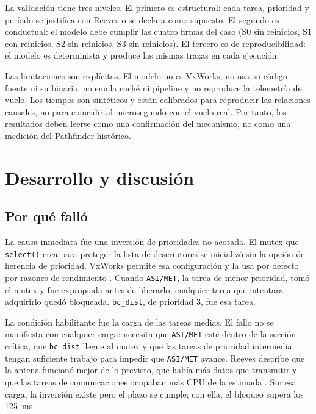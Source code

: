 \documentclass[journal]{IEEEtran}
\begin{document}
La validación tiene tres niveles. El primero es estructural: cada tarea, prioridad y período se justifica con Reeves o se declara como supuesto. El segundo es conductual: el modelo debe cumplir las cuatro firmas del caso (S0 sin reinicios, S1 con reinicios, S2 sin reinicios, S3 sin reinicios). El tercero es de reproducibilidad: el modelo es determinista y produce las mismas trazas en cada ejecución.

Las limitaciones son explícitas. El modelo no es VxWorks, no usa su código fuente ni su binario, no emula caché ni pipeline y no reproduce la telemetría de vuelo. Los tiempos son sintéticos y están calibrados para reproducir las relaciones causales, no para coincidir al microsegundo con el vuelo real. Por tanto, los resultados deben leerse como una confirmación del mecanismo, no como una medición del Pathfinder histórico.

\section{Desarrollo y discusión}
\label{sec:desarrollo}

\subsection{Por qué falló}
\label{sec:porque}

La causa inmediata fue una inversión de prioridades no acotada. El mutex que \texttt{select()} crea para proteger la lista de descriptores se inicializó sin la opción de herencia de prioridad. VxWorks permite esa configuración y la usa por defecto por razones de rendimiento \cite{reeves1997mars,reeves1999priority}. Cuando \texttt{ASI/MET}, la tarea de menor prioridad, tomó el mutex y fue expropiada antes de liberarlo, cualquier tarea que intentara adquirirlo quedó bloqueada. \texttt{bc\_dist}, de prioridad 3, fue esa tarea.

La condición habilitante fue la carga de las tareas medias. El fallo no se manifiesta con cualquier carga: necesita que \texttt{ASI/MET} esté dentro de la sección crítica, que \texttt{bc\_dist} llegue al mutex y que las tareas de prioridad intermedia tengan suficiente trabajo para impedir que \texttt{ASI/MET} avance. Reeves describe que la antena funcionó mejor de lo previsto, que había más datos que transmitir y que las tareas de comunicaciones ocupaban más CPU de la estimada \cite{reeves1997mars}. Sin esa carga, la inversión existe pero el plazo se cumple; con ella, el bloqueo supera los 125~ms.
\end{document}
